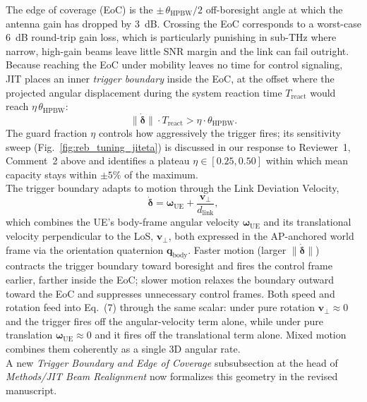 \documentclass{article}
\begin{document}
\noindent The edge of coverage (EoC) is the $\pm\,\theta_{\text{HPBW}}/2$ off-boresight angle at which the antenna gain has dropped by \SI{3}{\deci\bel}. Crossing the EoC corresponds to a worst-case \SI{6}{\deci\bel} round-trip gain loss, which is particularly punishing in sub-THz where narrow, high-gain beams leave little SNR margin and the link can fail outright. Because reaching the EoC under mobility leaves no time for control signaling, JIT places an inner \emph{trigger boundary} inside the EoC, at the offset where the projected angular displacement during the system reaction time $T_{\text{react}}$ would reach $\eta\,\theta_{\text{HPBW}}$:
\begin{equation*}
    \|\dot{\boldsymbol{\delta}}\| \cdot T_{\text{react}} > \eta \cdot \theta_{\text{HPBW}}. \tag{Eq.~7}
\end{equation*}
The guard fraction $\eta$ controls how aggressively the trigger fires; its sensitivity sweep (Fig.~\ref{fig:reb_tuning_jiteta}) is discussed in our response to Reviewer~1, Comment~2 above and identifies a plateau $\eta \in [0.25, 0.50]$ within which mean capacity stays within $\pm 5\%$ of the maximum.\\

\noindent The trigger boundary adapts to motion through the Link Deviation Velocity,
\begin{equation*}
    \dot{\boldsymbol{\delta}} = \boldsymbol{\omega}_{\text{UE}} + \frac{\mathbf{v}_{\perp}}{d_{\text{link}}}, \tag{Eq.~6}
\end{equation*}
which combines the UE's body-frame angular velocity $\boldsymbol{\omega}_{\text{UE}}$ and its translational velocity perpendicular to the LoS, $\mathbf{v}_{\perp}$, both expressed in the AP-anchored world frame via the orientation quaternion $\mathbf{q}_{\text{body}}$. Faster motion (larger $\|\dot{\boldsymbol{\delta}}\|$) contracts the trigger boundary toward boresight and fires the control frame earlier, farther inside the EoC; slower motion relaxes the boundary outward toward the EoC and suppresses unnecessary control frames. Both speed and rotation feed into Eq.~(7) through the same scalar: under pure rotation $\mathbf{v}_{\perp} \approx 0$ and the trigger fires off the angular-velocity term alone, while under pure translation $\boldsymbol{\omega}_{\text{UE}} \approx 0$ and it fires off the translational term alone. Mixed motion combines them coherently as a single 3D angular rate.\\


\noindent A new \emph{Trigger Boundary and Edge of Coverage} subsubsection at the head of \emph{Methods/JIT Beam Realignment} now formalizes this geometry in the revised manuscript.
\end{document}
